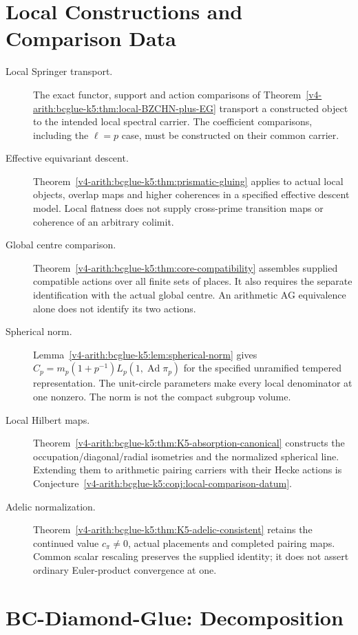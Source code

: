 \section{Local Constructions and Comparison Data}
\label{v4-arith:bcglue-k5:table}
\begin{description}
\item[Local Springer transport.]
The exact functor, support and action comparisons of
Theorem~\ref{v4-arith:bcglue-k5:thm:local-BZCHN-plus-EG}
transport a constructed object to the intended local spectral carrier.
The coefficient comparisons, including the \(\ell=p\) case, must
be constructed on their common carrier.
\item[Effective equivariant descent.]
Theorem~\ref{v4-arith:bcglue-k5:thm:prismatic-gluing} applies to
actual local objects, overlap maps and higher coherences in a
specified effective descent model. Local flatness does not supply
cross-prime transition maps or coherence of an arbitrary colimit.
\item[Global centre comparison.]
Theorem~\ref{v4-arith:bcglue-k5:thm:core-compatibility} assembles
supplied compatible actions over all finite sets of places. It also
requires the separate identification with the actual global centre.
An arithmetic AG equivalence alone does not identify its two actions.
\item[Spherical norm.]
Lemma~\ref{v4-arith:bcglue-k5:lem:spherical-norm} gives
\(C_p=m_p(1+p^{-1})L_p(1,\operatorname{Ad}\pi_p)\) for the
specified unramified tempered representation. The unit-circle
parameters make every local denominator at one nonzero. The norm
is not the compact subgroup volume.
\item[Local Hilbert maps.]
Theorem~\ref{v4-arith:bcglue-k5:thm:K5-absorption-canonical}
constructs the occupation/diagonal/radial isometries and the
normalized spherical line. Extending them to arithmetic pairing
carriers with their Hecke actions is
Conjecture~\ref{v4-arith:bcglue-k5:conj:local-comparison-datum}.
\item[Adelic normalization.]
Theorem~\ref{v4-arith:bcglue-k5:thm:K5-adelic-consistent} retains
the continued value \(c_\pi\ne0\), actual placements and completed
pairing maps. Common scalar rescaling preserves the supplied
identity; it does not assert ordinary Euler-product convergence at one.
\end{description}

\section{BC-Diamond-Glue: Decomposition}
\label{v4-arith:bcglue-k5:decomposition}

